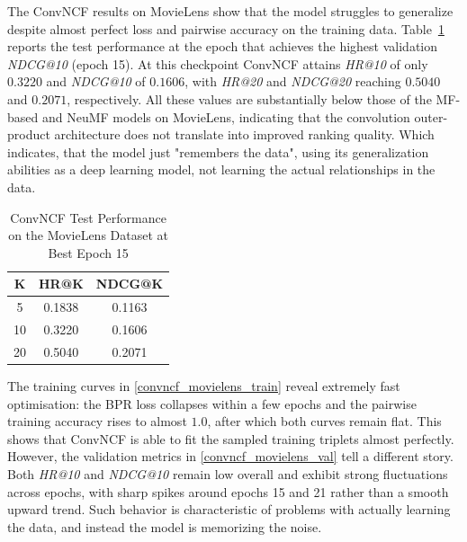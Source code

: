 \documentclass[11pt]{article}
\begin{document}
The ConvNCF results on MovieLens show that the model struggles to generalize despite almost perfect loss and pairwise accuracy on the training data.
Table~\ref{tab:convncf_movielens_results} reports the test performance at the epoch that achieves the highest validation \emph{NDCG@10} (epoch 15). At this checkpoint ConvNCF attains \emph{HR@10} of only $0.3220$ and \emph{NDCG@10} of $0.1606$, with \emph{HR@20} and \emph{NDCG@20} reaching $0.5040$ and $0.2071$, respectively. All these values are substantially below those of the MF-based and NeuMF models on MovieLens, indicating that the convolution outer-product architecture does not translate into improved ranking quality. Which indicates, that the model just "remembers the data", using its generalization abilities as a deep learning model, not learning the actual relationships in the data.
\begin{table}[H]
\centering
\caption{ConvNCF Test Performance on the MovieLens Dataset at Best Epoch 15}
\label{tab:convncf_movielens_results}
\begin{tabular}{c c c}
\hline
\textbf{K} & \textbf{HR@K} & \textbf{NDCG@K} \\
\hline
5  & 0.1838 & 0.1163 \\
10 & 0.3220 & 0.1606 \\
20 & 0.5040 & 0.2071 \\
\hline
\end{tabular}
\end{table}

The training curves in \ref{convncf_movielens_train} reveal extremely fast optimisation: the BPR loss collapses within a few epochs and the pairwise training accuracy rises to almost $1.0$, after which both curves remain flat. This shows that ConvNCF is able to fit the sampled training triplets almost perfectly. However, the validation metrics in \ref{convncf_movielens_val} tell a different story. Both \emph{HR@10} and \emph{NDCG@10} remain low overall and exhibit strong fluctuations across epochs, with sharp spikes around epochs 15 and 21 rather than a smooth upward trend. Such behavior is characteristic of problems with actually learning the data, and instead the model is memorizing the noise.
\end{document}
